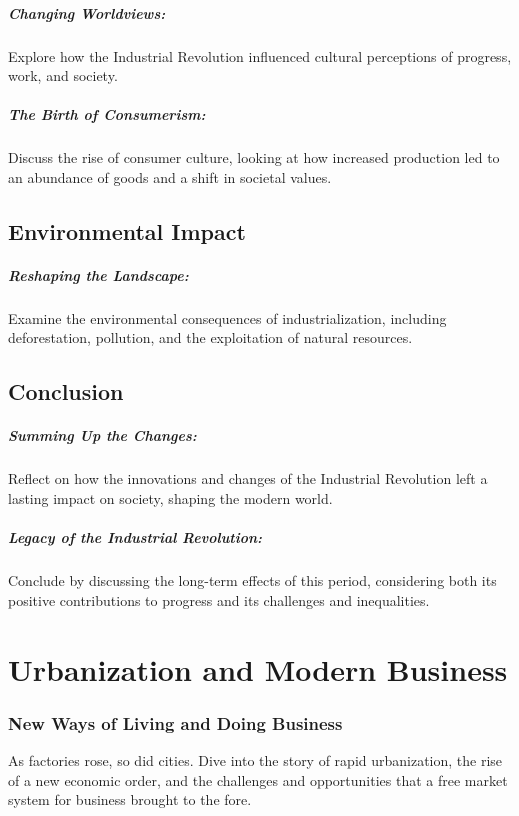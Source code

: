 \documentclass[a4paper,12pt]{book}
\begin{document}
\paragraph{Changing Worldviews:}
Explore how the Industrial Revolution influenced cultural perceptions of progress, work, and society.

\paragraph{The Birth of Consumerism:}
Discuss the rise of consumer culture, looking at how increased production led to an abundance of goods and a shift in societal values.

\section*{Environmental Impact}

\paragraph{Reshaping the Landscape:}
Examine the environmental consequences of industrialization, including deforestation, pollution, and the exploitation of natural resources.

\section*{Conclusion}

\paragraph{Summing Up the Changes:}
Reflect on how the innovations and changes of the Industrial Revolution left a lasting impact on society, shaping the modern world.

\paragraph{Legacy of the Industrial Revolution:}
Conclude by discussing the long-term effects of this period, considering both its positive contributions to progress and its challenges and inequalities.

\chapter{Urbanization and Modern Business}
\subsection*{New Ways of Living and Doing Business}
As factories rose, so did cities. Dive into the story of rapid urbanization, the rise of a new economic order, and the challenges and opportunities that a free market system for business brought to the fore.
\end{document}
